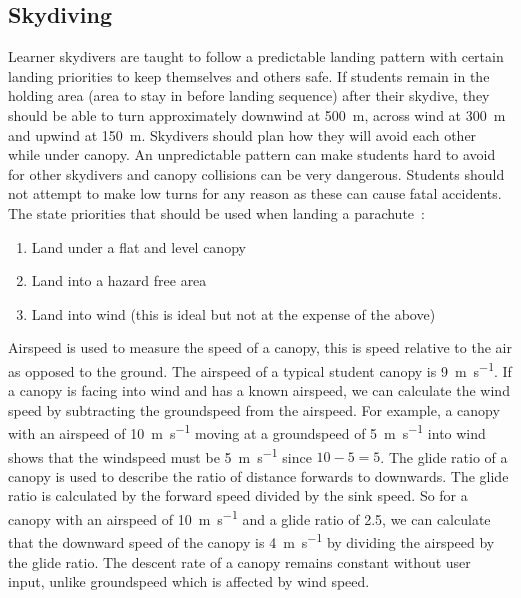\documentclass[11pt, a4paper, twocolumn]{article}
\begin{document}
\subsection{Skydiving}
Learner skydivers are taught to follow a predictable landing pattern with certain landing priorities to keep themselves and others safe. If students remain in the holding area (area to stay in before landing sequence) after their skydive, they should be able to turn approximately downwind at \SI{500}{\metre}, across wind at \SI{300}{\metre} and upwind at \SI{150}{\metre}. Skydivers should plan how they will avoid each other while under canopy. An unpredictable pattern can make students hard to avoid for other skydivers and canopy collisions can be very dangerous. Students should not attempt to make low turns for any reason as these can cause fatal accidents. The \citeauthor{british_parachute_association_chmanual.pdf_nodate} state priorities that should be used when landing a parachute~\cite{british_parachute_association_chmanual.pdf_nodate}:

\begin{enumerate}
    \item Land under a flat and level canopy
    \item Land into a hazard free area
    \item Land into wind (this is ideal but not at the expense of the above)
\end{enumerate}


Airspeed is used to measure the speed of a canopy, this is speed relative to the air as opposed to the ground. The airspeed of a typical student canopy is \SI{9}{\metre\per\second}. If a canopy is facing into wind and has a known airspeed, we can calculate the wind speed by subtracting the groundspeed from the airspeed. For example, a canopy with an airspeed of \SI{10}{\metre\per\second} moving at a groundspeed of \SI{5}{\metre\per\second} into wind shows that the windspeed must be \SI{5}{\metre\per\second} since $10 - 5 = 5$.
The glide ratio of a canopy is used to describe the ratio of distance forwards to downwards. The glide ratio is calculated by the forward speed divided by the sink speed. So for a canopy with an airspeed of \SI{10}{\metre\per\second} and a glide ratio of 2.5, we can calculate that the downward speed of the canopy is \SI{4}{\metre\per\second} by dividing the airspeed by the glide ratio. The descent rate of a canopy remains constant without user input, unlike groundspeed which is affected by wind speed.
\end{document}
